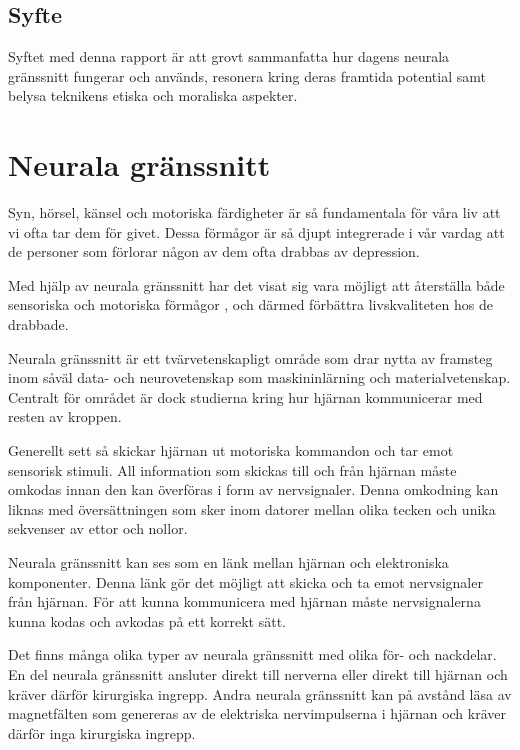 \documentclass[12pt, a4paper]{article}
\begin{document}
\subsection{Syfte}

Syftet med denna rapport är att grovt sammanfatta hur dagens neurala gränssnitt
fungerar och används, resonera kring deras framtida potential samt belysa
teknikens etiska och moraliska aspekter.


\section{Neurala gränssnitt}

Syn, hörsel, känsel och motoriska färdigheter är så fundamentala för våra liv
att vi ofta tar dem för givet. Dessa förmågor är så djupt integrerade i vår
vardag att de personer som förlorar någon av dem ofta drabbas av depression.
\cite{depression}

Med hjälp av neurala gränssnitt har det visat sig vara möjligt att återställa
både sensoriska \cite{sight1,sound,touch} och motoriska förmågor
\cite{prosthetic_operation}, och därmed förbättra livskvaliteten hos de
drabbade.

Neurala gränssnitt är ett tvärvetenskapligt område som drar nytta av framsteg
inom såväl data- och neurovetenskap som maskininlärning och materialvetenskap.
Centralt för området är dock studierna kring hur hjärnan kommunicerar med resten
av kroppen.

Generellt sett så skickar hjärnan ut motoriska kommandon och tar emot sensorisk
stimuli. All information som skickas till och från hjärnan måste omkodas innan
den kan överföras i form av nervsignaler. Denna omkodning kan liknas med
översättningen som sker inom datorer mellan olika tecken och unika sekvenser av
ettor och nollor.

Neurala gränssnitt kan ses som en länk mellan hjärnan och elektroniska
komponenter. Denna länk gör det möjligt att skicka och ta emot nervsignaler från
hjärnan. För att kunna kommunicera med hjärnan måste nervsignalerna kunna kodas
och avkodas på ett korrekt sätt.

Det finns många olika typer av neurala gränssnitt med olika för- och nackdelar.
En del neurala gränssnitt ansluter direkt till nerverna eller direkt till
hjärnan och kräver därför kirurgiska ingrepp. Andra neurala gränssnitt kan på
avstånd läsa av magnetfälten som genereras av de elektriska nervimpulserna i
hjärnan och kräver därför inga kirurgiska ingrepp.
\end{document}
